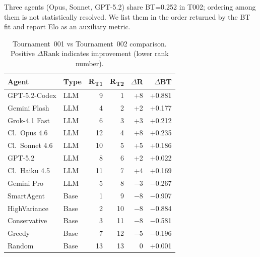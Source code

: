 \documentclass[11pt]{article}
\newcommand{\tTwo}{T002}
\begin{document}
Three agents (Opus, Sonnet, GPT-5.2) share BT=0.252 in \tTwo; ordering among them is not statistically resolved.
We list them in the order returned by the BT fit and report Elo as an auxiliary metric.

\begin{table}[t]
\centering
\small
\caption{Tournament~001 vs Tournament~002 comparison. Positive $\Delta$Rank indicates improvement (lower rank number).}
\label{tab:t1_t2_comp}
\begin{tabular}{llrrrr}
\toprule
Agent & Type & R\textsubscript{T1} & R\textsubscript{T2} & $\Delta$R & $\Delta$BT \\
\midrule
GPT-5.2-Codex & LLM & 9 & 1 & +8 & +0.881 \\
Gemini Flash & LLM & 4 & 2 & +2 & +0.177 \\
Grok-4.1 Fast & LLM & 6 & 3 & +3 & +0.212 \\
Cl.\ Opus 4.6 & LLM & 12 & 4 & +8 & +0.235 \\
Cl.\ Sonnet 4.6 & LLM & 10 & 5 & +5 & +0.186 \\
GPT-5.2 & LLM & 8 & 6 & +2 & +0.022 \\
Cl.\ Haiku 4.5 & LLM & 11 & 7 & +4 & +0.169 \\
Gemini Pro & LLM & 5 & 8 & $-$3 & $-$0.267 \\
SmartAgent & Base & 1 & 9 & $-$8 & $-$0.907 \\
HighVariance & Base & 2 & 10 & $-$8 & $-$0.884 \\
Conservative & Base & 3 & 11 & $-$8 & $-$0.581 \\
Greedy & Base & 7 & 12 & $-$5 & $-$0.196 \\
Random & Base & 13 & 13 & 0 & +0.001 \\
\bottomrule
\end{tabular}
\end{table}
\end{document}
